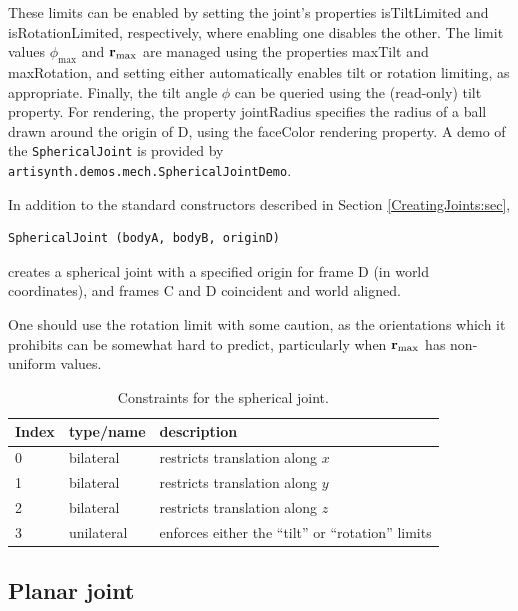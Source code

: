 These limits can be enabled by setting the joint's properties {\sf
isTiltLimited} and {\sf isRotationLimited}, respectively, where
enabling one disables the other. The limit values $\phi_\text{max}$
and ${\bf r}_\text{max}$ are managed using the properties {\sf maxTilt} and
{\sf maxRotation}, and setting either automatically enables tilt or
rotation limiting, as appropriate. Finally, the tilt angle $\phi$ can
be queried using the (read-only) {\sf tilt} property.  For rendering,
the property {\sf jointRadius} specifies the radius of a ball drawn
around the origin of D, using the {\sf faceColor} rendering
property. A demo of the {\tt SphericalJoint} is provided by {\tt
artisynth.demos.mech.SphericalJointDemo}.

In addition to the standard constructors described in
Section \ref{CreatingJoints:sec},
\begin{lstlisting}[]
  SphericalJoint (bodyA, bodyB, originD)
\end{lstlisting}
%
creates a spherical joint with a specified origin for frame D (in
world coordinates), and frames C and D coincident and world aligned.

\begin{sideblock}
One should use the rotation limit with some caution, as the
orientations which it prohibits can be somewhat hard to predict,
particularly when ${\bf r}_\text{max}$ has non-uniform values.
\end{sideblock}

\begin{table}[h]
\centering
\begin{tabular}{|l|l|l|}
\hline
Index & type/name & description \\
\hline
0 & bilateral & restricts translation along $x$ \\
1 & bilateral & restricts translation along $y$ \\
2 & bilateral & restricts translation along $z$ \\
3 & unilateral & enforces either the ``tilt'' or ``rotation'' limits\\
\hline
\end{tabular}
\caption{Constraints for the spherical joint.}
\label{SphericalConstraints:tbl}
\end{table}

\subsection{Planar joint}

